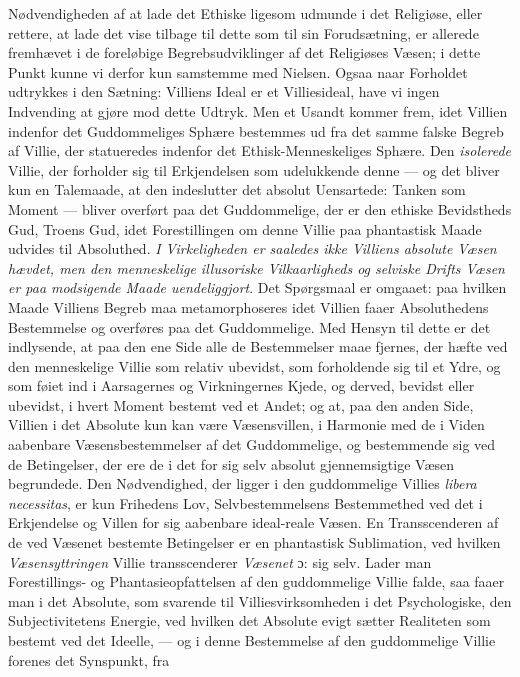 \documentclass[12pt,a4paper]{book}
\newcommand{\opage}[1]{\marginnote{\footnotesize\textit{[#1]}}}
\begin{document}
Nødvendigheden af at lade det Ethiske ligesom udmunde i det Religiøse, eller rettere, at
lade det vise tilbage til dette som til sin Forudsætning, er allerede fremhævet i de
foreløbige Begrebsudviklinger af det Religiøses Væsen; i dette Punkt kunne vi derfor kun
samstemme med Nielsen. Ogsaa naar Forholdet udtrykkes i den Sætning: Villiens Ideal er et
Villiesideal, have vi ingen Indvending at gjøre mod dette Udtryk. Men et Usandt kommer frem,
idet Villien indenfor det Guddommeliges Sphære bestemmes ud fra det samme falske Begreb af
Villie, der statueredes indenfor det Ethisk-Menneskeliges Sphære. Den \emph{isolerede} Villie, der
forholder sig til Erkjendelsen som udelukkende denne --- og det bliver kun en Talemaade, at
den indeslutter det absolut Uensartede: Tanken som Moment --- bliver overført paa det
Guddommelige, der er den ethiske Bevidstheds Gud, Troens Gud, idet Forestillingen om denne
Villie paa phantastisk Maade udvides til Absoluthed. \emph{I Virkeligheden er saaledes ikke
Villiens absolute Væsen hævdet, men den menneskelige illusoriske Vilkaarligheds og selviske
Drifts Væsen er paa modsigende Maade uendeliggjort}. Det Spørgsmaal er omgaaet: paa hvilken
Maade Villiens Begreb maa metamorphoseres idet Villien faaer Absoluthedens Bestemmelse og
overføres paa det Guddommelige. Med Hensyn til dette er det indlysende, at paa den ene Side
alle de Bestemmelser maae fjernes, der hæfte ved den menneskelige Villie som relativ
ubevidst, som forholdende sig til et Ydre, og som føiet ind i Aarsagernes og Virkningernes
Kjede, og derved, bevidst eller ubevidst, i hvert \opage{166}Moment bestemt ved et Andet; og at, paa
den anden Side, Villien i det Absolute kun kan være Væsensvillen, i Harmonie med de i Viden
aabenbare Væsensbestemmelser af det Guddommelige, og bestemmende sig ved de Betingelser, der
ere de i det for sig selv absolut gjennemsigtige Væsen begrundede. Den Nødvendighed, der
ligger i den guddommelige Villies \textit{libera necessitas}, er kun Frihedens Lov,
Selvbestemmelsens Bestemmethed ved det i Erkjendelse og Villen for sig aabenbare ideal-reale
Væsen. En Transscenderen af de ved Væsenet bestemte Betingelser er en phantastisk
Sublimation, ved hvilken \emph{Væsensyttringen} Villie transscenderer \emph{Væsenet} ɔ: sig selv.
Lader man Forestillings- og Phantasieopfattelsen af den guddommelige Villie falde, saa faaer
man i det Absolute, som svarende til Villiesvirksomheden i det Psychologiske, den
Subjectivitetens Energie, ved hvilken det Absolute evigt sætter Realiteten som bestemt ved
det Ideelle, --- og i denne Bestemmelse af den guddommelige Villie forenes det Synspunkt, fra
\end{document}

